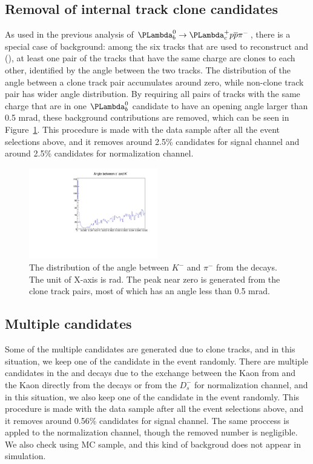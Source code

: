 \subsection{Removal of internal track clone candidates}
\label{sec:remove_in_clone}
As used in the previous analysis of $\LbLcpppi$, 
there is a special case of background: 
among the six tracks that are used to reconstruct \LbLckkpi and \LbLcDs(\Dskkpi), 
at least one pair of the tracks that have the same charge are clones to each other, 
identified by the angle between the two tracks. 
The distribution of the angle between a clone track pair accumulates around zero, 
while non-clone track pair has wider angle distribution. 
By requiring all pairs of tracks with the same charge that are in one $\Lb$ candidate to have an opening angle larger than 0.5 mrad, 
these background contributions are removed, 
which can be seen in Figure~\ref{fig:clone_cut_estimate}. 
This procedure is made with the data sample after all the event selections above, 
and it removes around 2.5\% candidates for signal channel and around 2.5\% candidates for normalization channel. 


\begin{figure}[!bth]
\centering
\includegraphics[width=0.5\textwidth]{Figures/05_open_charm/02_selection/clone_track.pdf}
\caption{The distribution of the angle between $K^-$ and $\pi^-$ from the \LbLckkpi decays. 
   The unit of X-axis is rad. 
   The peak near zero is generated from the clone track pairs, 
   most of which has an angle less than 0.5 mrad.}
\label{fig:clone_cut_estimate}
\end{figure}


\subsection{Multiple candidates}
\label{sec:remove_multi}

Some of the multiple candidates are generated due to clone tracks, 
and in this situation, 
we keep one of the candidate in the event randomly. 
There are multiple candidates in the \LbLckkpi and \LbLcDs decays due to the exchange 
between the Kaon from \Lc and the Kaon directly from the \Lb decays or from the $D_s^-$ for normalization channel, 
and in this situation, 
we also keep one of the candidate in the event randomly. 
This procedure is made with the data sample after all the event selections above, 
and it removes around 0.56\% candidates for signal channel. 
The same proccess is appled to the normalization channel, 
though the removed number is negligible. We also check using MC sample, 
and this kind of backgroud does not appear in simulation. 


